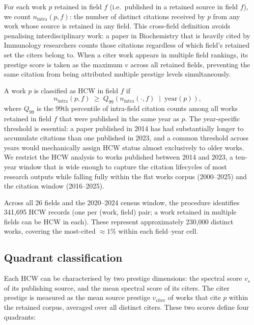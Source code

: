 For each work $p$ retained in field $f$ (i.e.\ published in a retained source
in field $f$), we count $n_{\mathrm{intra}}(p, f)$: the number of distinct
citations received by $p$ from any work whose source is retained in any field.
This cross-field definition avoids penalising interdisciplinary work: a paper
in Biochemistry that is heavily cited by Immunology researchers counts those
citations regardless of which field's retained set the citers belong to.  When
a citer work appears in multiple field rankings, its prestige score is taken as
the maximum $v$ across all retained fields, preventing the same citation from
being attributed multiple prestige levels simultaneously.

A work $p$ is classified as HCW in field $f$ if
\[
  n_{\mathrm{intra}}(p, f) \;\geq\; Q_{99}\!\left(n_{\mathrm{intra}}(\cdot,
  f)\;\middle|\;\mathrm{year}(p)\right),
\]
where $Q_{99}$ is the 99th percentile of intra-field citation counts among all
works retained in field $f$ that were published in the same year as $p$.  The
year-specific threshold is essential: a paper published in 2014 has had
substantially longer to accumulate citations than one published in 2023, and a
common threshold across years would mechanically assign HCW status almost
exclusively to older works.  We restrict the HCW analysis to works published
between 2014 and 2023, a ten-year window that is wide enough to capture the
citation lifecycles of most research outputs while falling fully within the
flat works corpus (2000--2025) and the citation window (2016--2025).

Across all 26 fields and the 2020--2024 census window, the procedure identifies
341,695 HCW records (one per (work, field) pair; a work retained in multiple
fields can be HCW in each).  These represent approximately 230,000 distinct
works, covering the most-cited $\approx 1\%$ within each field--year cell.

\subsection{Quadrant classification}

Each HCW can be characterised by two prestige dimensions: the spectral score
$v_s$ of its publishing source, and the mean spectral score of its citers.
The citer prestige is measured as the mean source prestige $v_{\mathrm{citer}}$
of works that cite $p$ within the retained corpus, averaged over all distinct
citers.  These two scores define four quadrants:

